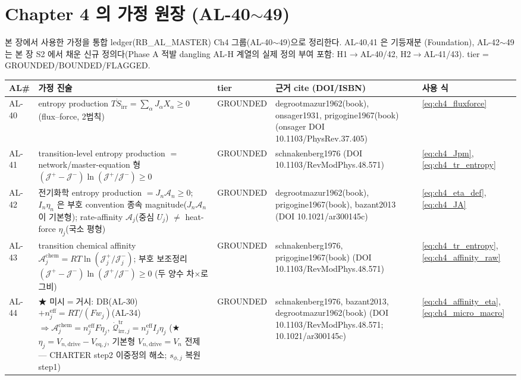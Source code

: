 \documentclass[11pt,a4paper]{article}
\newcommand{\eff}{\mathrm{eff}}
\newcommand{\eq}{\mathrm{eq}}
\newcommand{\drive}{\mathrm{drive}}
\newcommand{\irr}{\mathrm{irr}}
\newcommand{\tr}{\mathrm{tr}}
\newcommand{\chem}{\mathrm{chem}}
\newcommand{\brk}{\discretionary{}{}{}}%
\begin{document}
\section{Chapter 4 의 가정 원장 (AL-40$\sim$49)}\label{sec:ch4_al}
본 장에서 사용한 가정을 통합 ledger(RB\_AL\_MASTER) Ch4 그룹(AL-40$\sim$49)으로 정리한다. AL-40,41 은 기등재분
(Foundation), AL-42$\sim$49 는 본 장 S2 에서 채운 신규 정의다(Phase A 적발 dangling AL-H 계열의 실제 정의 부여
포함: H1$\to$AL-40/42, H2$\to$AL-41/43). tier = GROUNDED/BOUNDED/FLAGGED.
{\footnotesize
\setlength{\tabcolsep}{3pt}
\sloppy
\begin{longtable}{>{\raggedright\arraybackslash}p{} >{\raggedright\arraybackslash}p{} >{\raggedright\arraybackslash}p{} >{\raggedright\arraybackslash}p{} >{\raggedright\arraybackslash}p{}}
\toprule AL\# & 가정 진술 & tier & 근거 cite (DOI/ISBN) & 사용 식 \\ \midrule \endhead
AL-40 & entropy production $T\dot S_\irr=\sum_\alpha J_\alpha X_\alpha\ge0$ (flux--force, 2법칙) & GROUNDED & degrootmazur1962(book), onsager1931, prigogine1967(book) (onsager DOI 10.1103/\brk PhysRev.37.405) & \eqref{eq:ch4_fluxforce} \\
AL-41 & transition-level entropy production $=$ network/master-equation 형 $(\mathcal J^+{-}\mathcal J^-)\ln(\mathcal J^+/\mathcal J^-)\ge0$ & GROUNDED & schnakenberg1976 (DOI 10.1103/\brk RevModPhys.48.571) & \eqref{eq:ch4_Jpm},\allowbreak\eqref{eq:ch4_tr_entropy} \\
AL-42 & 전기화학 entropy production $=J_n\mathcal A_n\ge0$; $I_n\eta_n$ 은 부호 convention 종속 magnitude($J_n\mathcal A_n$ 이 기본형); rate-affinity $\mathcal A_j$(중심 $U_j$) $\ne$ heat-force $\eta_j$(국소 평형) & GROUNDED & degrootmazur1962(book), prigogine1967(book), bazant2013 (DOI 10.1021/\brk ar300145c) & \eqref{eq:ch4_eta_def},\allowbreak\eqref{eq:ch4_JA} \\
AL-43 & transition chemical affinity $\mathcal A_j^{\chem}=RT\ln(\mathcal J_j^+/\mathcal J_j^-)$; 부호 보조정리 $(\mathcal J^+{-}\mathcal J^-)\ln(\mathcal J^+/\mathcal J^-)\ge0$ (두 양수 차×로그비) & GROUNDED & schnakenberg1976, prigogine1967(book) (DOI 10.1103/\brk RevModPhys.48.571) & \eqref{eq:ch4_tr_entropy},\allowbreak\eqref{eq:ch4_affinity_raw} \\
AL-44 & ★ 미시$=$거시: DB(AL-30)$+n_j^\eff{=}RT/(Fw_j)$(AL-34) $\Rightarrow\mathcal A_j^{\chem}{=}n_j^\eff F\eta_j$, $\dot{\mathcal Q}_{\irr,j}^{\tr}{=}n_j^\eff I_j\eta_j$ (★ $\eta_j{=}V_{n,\drive}{-}V_{\eq,j}$, 기본형 $V_{n,\drive}{=}V_n$ 전제 — CHARTER step2 이중정의 해소; $s_{\phi,j}$ 복원 step1) & GROUNDED & schnakenberg1976, bazant2013, degrootmazur1962(book) (DOI 10.1103/\brk RevModPhys.48.571; 10.1021/\brk ar300145c) & \eqref{eq:ch4_affinity_eta},\allowbreak\eqref{eq:ch4_micro_macro} \\

\end{longtable}}
\end{document}
